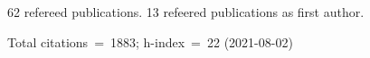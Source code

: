 62 refereed publications. 13 refeered publications as first author.

Total citations~=~1883; h-index~=~22 (2021-08-02)